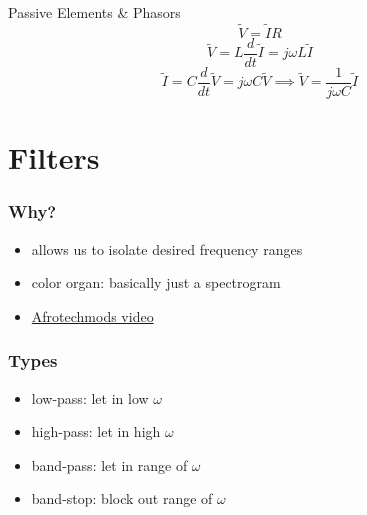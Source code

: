 \documentclass[aspectratio=169]{beamer}
\begin{document}
\begin{frame}{Passive Elements \& Phasors}
    \begin{equation}
        \widetilde{V} = \widetilde{I} R
    \end{equation}
    \begin{equation}
        \widetilde{V} = L \frac{d}{dt} \widetilde{I} = j \omega L \widetilde{I}
    \end{equation}
    \begin{equation}
        \widetilde{I} = C \frac{d}{dt} \widetilde{V} = j \omega C \widetilde{V} \implies \widetilde{V} = \frac{1}{j \omega C} \widetilde{I}
    \end{equation}
\end{frame}

\section{Filters}

\begin{frame}
    \frametitle{Why?}

    \begin{itemize}
        \item allows us to isolate desired frequency ranges
        \item color organ: basically just a spectrogram
        \item \href{https://youtu.be/OBM5T5_kgdI}{Afrotechmods video}
    \end{itemize}
\end{frame}

\begin{frame}
    \frametitle{Types}

    \begin{itemize}
        \item low-pass: let in low \(\omega\)
        \item high-pass: let in high \(\omega\)
        \item band-pass: let in range of \(\omega\)
        \item band-stop: block out range of \(\omega\)
    \end{itemize}

\end{frame}
\end{document}
